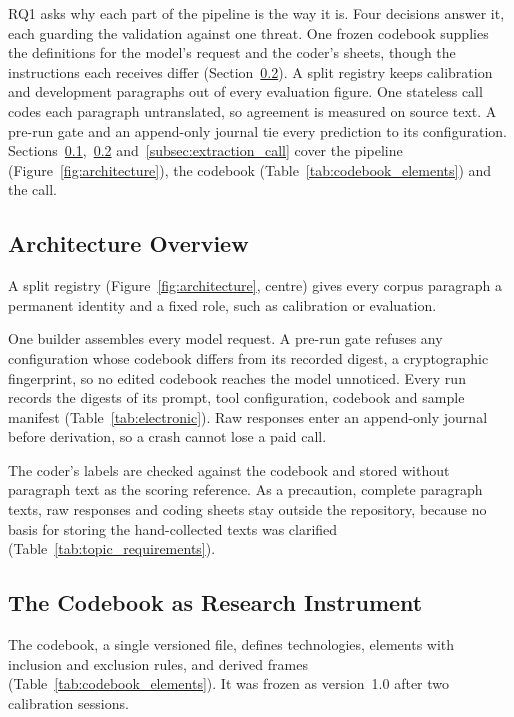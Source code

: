 RQ1 asks why each part of the pipeline is the way it is. Four decisions answer it, each guarding the validation against one threat. One frozen codebook supplies the definitions for the model's request and the coder's sheets, though the instructions each receives differ (Section~\ref{subsec:codebook}). A split registry keeps calibration and development paragraphs out of every evaluation figure. One stateless call codes each paragraph untranslated, so agreement is measured on source text. A pre-run gate and an append-only journal tie every prediction to its configuration. Sections~\ref{subsec:architecture},~\ref{subsec:codebook} and~\ref{subsec:extraction_call} cover the pipeline (Figure~\ref{fig:architecture}), the codebook (Table~\ref{tab:codebook_elements}) and the call.

\subsection{Architecture Overview}\label{subsec:architecture}

A split registry (Figure~\ref{fig:architecture}, centre) gives every corpus paragraph a permanent identity and a fixed role, such as calibration or evaluation.



One builder assembles every model request. A pre-run gate refuses any configuration whose codebook differs from its recorded digest, a cryptographic fingerprint, so no edited codebook reaches the model unnoticed. Every run records the digests of its prompt, tool configuration, codebook and sample manifest (Table~\ref{tab:electronic}). Raw responses enter an append-only journal before derivation, so a crash cannot lose a paid call.

The coder's labels are checked against the codebook and stored without paragraph text as the scoring reference. As a precaution, complete paragraph texts, raw responses and coding sheets stay outside the repository, because no basis for storing the hand-collected texts was clarified (Table~\ref{tab:topic_requirements}).

\subsection{The Codebook as Research Instrument}\label{subsec:codebook}

The codebook, a single versioned file, defines technologies, elements with inclusion and exclusion rules, and derived frames (Table~\ref{tab:codebook_elements}). It was frozen as version~1.0 after two calibration sessions.

